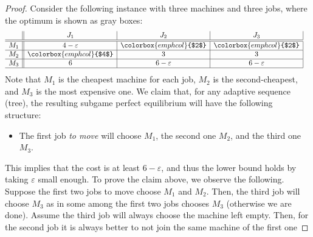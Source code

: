 \documentclass[runningheads]{llncs}
\newcommand{\take}[1]{\colorbox{emphcol}{$#1$}}
\renewcommand{\epsilon}{\varepsilon}
\begin{document}
\begin{proof}
%
Consider the following instance with three machines and three jobs, where the optimum is shown as gray boxes:
\begin{align*}\begin{array}{c||c|c|c|}
& J_1 & J_2 & J_3 \\ \hline \hline
M_1 & 4 -\epsilon &  \take{2} & \take{2}  \\ \hline
M_2 & \take{4} & 3 & 3  \\ \hline
M_3 & 6 & 6-\epsilon & 6-\epsilon  \\ \hline 
\end{array} &&
\end{align*}
Note that $M_1$ is the cheapest machine for each job, $M_2$ is the second-cheapest, and $M_3$ is the most expensive one. We claim that, for any adaptive sequence (tree), the resulting subgame perfect equilibrium will have the following structure:
\begin{itemize}
	\item The first job \emph{to move} will choose $M_1$, the second one $M_2$, and the third one $M_3$. 
\end{itemize}
This implies that the cost is at least $6-\epsilon$, and thus the lower bound holds by taking $\epsilon$ small enough. 
To prove the claim above, we observe the following. Suppose the first two jobs to move choose $M_1$ and $M_2$. Then, the third job will choose $M_3$ as  in some  among the first two jobs chooses $M_3$ (otherwise we are done). Assume the third job will always choose the machine left empty. Then, for the second job it is always better to not join the same machine of the first one

\end{proof}
\end{document}
